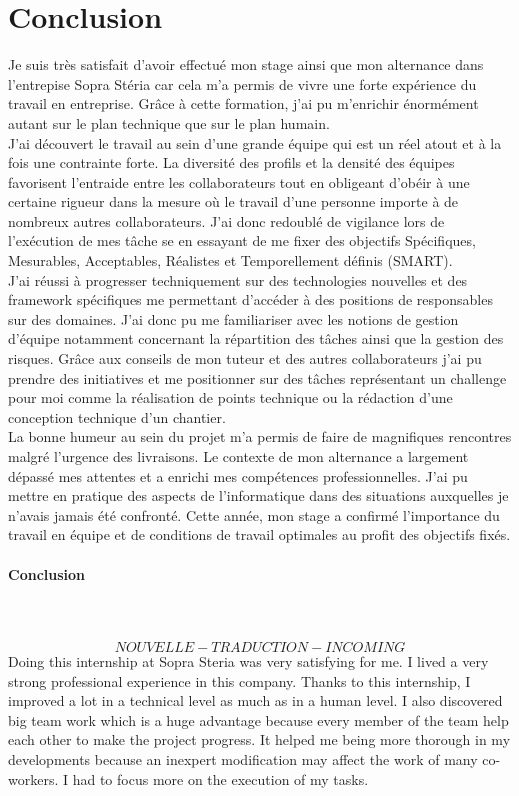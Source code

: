 \documentclass[12pt,a4paper]{article}
\begin{document}
\section{Conclusion}
Je suis très satisfait d’avoir effectué mon stage ainsi que mon alternance dans l'entrepise Sopra Stéria car cela m’a permis de vivre une forte expérience du travail en entreprise. Grâce à cette formation, j’ai pu m’enrichir énormément autant sur le plan technique que sur le plan humain.\\
J’ai découvert le travail au sein d'une grande équipe qui est un réel atout et à la fois une contrainte forte. La diversité des profils et la densité des équipes favorisent l'entraide entre les collaborateurs tout en obligeant d'obéir à une certaine rigueur dans la mesure où le travail d'une personne importe à de nombreux autres collaborateurs. J’ai donc redoublé de vigilance lors de l’exécution de mes tâche se en essayant de me fixer des objectifs Spécifiques, Mesurables, Acceptables, Réalistes et Temporellement définis (SMART).\\
J'ai réussi à progresser techniquement sur des technologies nouvelles et des framework spécifiques me permettant d'accéder à des positions de responsables sur des domaines. J'ai donc pu me familiariser avec les notions de gestion d'équipe notamment concernant la répartition des tâches ainsi que la gestion des risques. Grâce aux conseils de mon tuteur et des autres collaborateurs j'ai pu prendre des initiatives et me positionner sur des tâches représentant un challenge pour moi comme la réalisation de points technique ou la rédaction d'une conception technique d'un chantier. \\
La bonne humeur au sein du projet m'a permis de faire de magnifiques rencontres malgré l’urgence des livraisons. Le contexte de mon alternance a largement dépassé mes attentes et a enrichi mes compétences professionnelles. J'ai pu mettre en pratique des aspects de l'informatique dans des situations auxquelles je n'avais jamais été confronté.
Cette année, mon stage a confirmé l'importance du travail en équipe et de conditions de travail optimales au profit des objectifs fixés.

\paragraph{Conclusion}
~~\\\\
\[NOUVELLE-TRADUCTION-INCOMING\]
Doing this internship at Sopra Steria was very satisfying for me. I lived a very strong professional experience in this company. Thanks to this internship, I improved a lot in a technical level as much as in a human level. I also discovered big team work which is a huge advantage because every member of the team help each other to make the project progress. It helped me being more thorough in my developments because an inexpert modification may affect the work of many co-workers. I had to focus more on the execution of my tasks.
\end{document}
